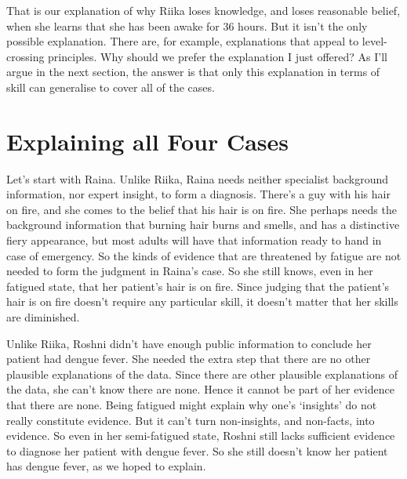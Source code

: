 \documentclass[
  10pt,
  letterpaper,
  twoside]{scrbook}
\begin{document}
That is our explanation of why {Riika} loses knowledge, and loses
reasonable belief, when she learns that she has been awake for 36 hours.
But it isn't the only possible explanation. There are, for example,
explanations that appeal to level-crossing principles. Why should we
prefer the explanation I just offered? As I'll argue in the next
section, the answer is that only this explanation in terms of skill can
generalise to cover all of the cases.

\section{Explaining all Four Cases}\label{explainingallfourcases}

Let's start with Raina. Unlike {Riika}, Raina needs neither specialist
background information, nor expert insight, to form a diagnosis. There's
a guy with his hair on fire, and she comes to the belief that his hair
is on fire. She perhaps needs the background information that burning
hair burns and smells, and has a distinctive fiery appearance, but most
adults will have that information ready to hand in case of emergency. So
the kinds of evidence that are threatened by fatigue are not needed to
form the judgment in Raina's case. So she still knows, even in her
fatigued state, that her patient's hair is on fire. Since judging that
the patient's hair is on fire doesn't require any particular skill, it
doesn't matter that her skills are diminished.

Unlike {Riika}, {Roshni} didn't have enough public information to
conclude her patient had dengue fever. She needed the extra step that
there are no other plausible explanations of the data. Since there are
other plausible explanations of the data, she can't know there are none.
Hence it cannot be part of her evidence that there are none. Being
fatigued might explain why one's `insights' do not really constitute
evidence. But it can't turn non-insights, and non-facts, into evidence.
So even in her semi-fatigued state, {Roshni} still lacks sufficient
evidence to diagnose her patient with dengue fever. So she still doesn't
know her patient has dengue fever, as we hoped to explain.
\end{document}
